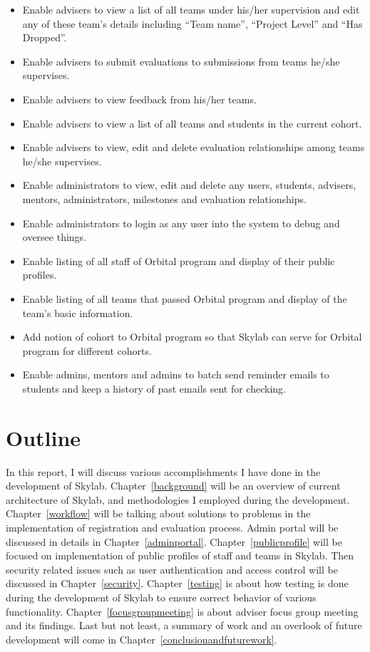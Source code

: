 \begin{itemize}
  \item Enable advisers to view a list of all teams under his/her supervision and edit any of these team's details including ``Team name'', ``Project Level'' and ``Has Dropped''.
  \item Enable advisers to submit evaluations to submissions from teams he/she supervises.
  \item Enable advisers to view feedback from his/her teams.
  \item Enable advisers to view a list of all teams and students in the current cohort.
  \item Enable advisers to view, edit and delete evaluation relationships among teams he/she supervises.
  \item Enable administrators to view, edit and delete any users, students, advisers, mentors, administrators, milestones and evaluation relationships.
  \item Enable administrators to login as any user into the system to debug and oversee things.
  \item Enable listing of all staff of Orbital program and display of their public profiles.
  \item Enable listing of all teams that passed Orbital program and display of the team's basic information.
  \item Add notion of cohort to Orbital program so that Skylab can serve for Orbital program for different cohorts.
  \item Enable admins, mentors and admins to batch send reminder emails to students and keep a history of past emails sent for checking.
\end{itemize}

\section{Outline}

In this report, I will discuss various accomplishments I have done in the development of Skylab. Chapter~\ref{background} will be an overview of current architecture of Skylab, and methodologies I employed during the development. Chapter~\ref{workflow} will be talking about solutions to problems in the implementation of registration and evaluation process. Admin portal will be discussed in details in Chapter~\ref{adminportal}. Chapter~\ref{publicprofile} will be focused on implementation of public profiles of staff and teams in Skylab. Then security related issues such as user authentication and access control will be discussed in Chapter~\ref{security}. Chapter~\ref{testing} is about how testing is done during the development of Skylab to ensure correct behavior of various functionality. Chapter~\ref{focusgroupmeeting} is about adviser focus group meeting and its findings. Last but not least, a summary of work and an overlook of future development will come in Chapter~\ref{conclusionandfuturework}.

